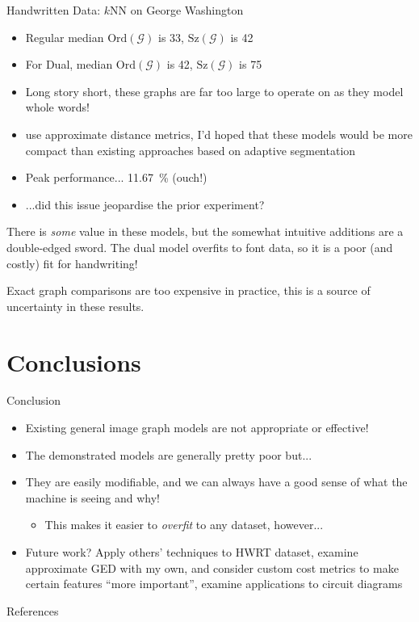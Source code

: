 \begin{frame}{Handwritten Data: $k$NN on George Washington}
	\begin{itemize}
		\item Regular median $\text{Ord}(\mathcal{G})$ is 33, $\text{Sz}(\mathcal{G})$ is 42
		\item For Dual, median $\text{Ord}(\mathcal{G})$ is 42, $\text{Sz}(\mathcal{G})$ is 75
		\item Long story short, these graphs are \alert{far too large to operate on} as they model whole words!
		\item \citeauthor{Graphs-Handwriting} use approximate distance metrics, I'd hoped that these models would be more compact than existing approaches based on adaptive segmentation
		\item \alert{Peak performance... \SI{11.67}{\percent} (ouch!)}
		\item ...did this issue jeopardise the prior experiment?
	\end{itemize}
\end{frame}

\begin{frame}[standout]
	There is \emph{some} value in these models, but the somewhat intuitive additions are a double-edged sword.
	The dual model \alert{overfits} to font data, so it is a poor (and costly) fit for handwriting! 

	Exact graph comparisons are too expensive in practice, this is a source of uncertainty in these results.
\end{frame}

\section{Conclusions}


\begin{frame}{Conclusion}
	\begin{itemize}[<+- | alert@+>]
		\item Existing general image graph models are not appropriate or effective!
		\item The demonstrated models are generally pretty poor but...
		\item They are easily modifiable, and we can always have a good sense of what the machine is seeing and why!
		\begin{itemize}
			\item This makes it easier to \emph{overfit} to any dataset, however...
		\end{itemize}
		\item Future work? Apply others' techniques to HWRT dataset, examine approximate GED with my own, and consider custom cost metrics to make certain features ``more important'', examine applications to circuit diagrams
	\end{itemize}
	
	\pause
	
\end{frame}

\appendix

\begin{frame}[allowframebreaks]{References}

\printbibliography[heading=none]

\end{frame}

